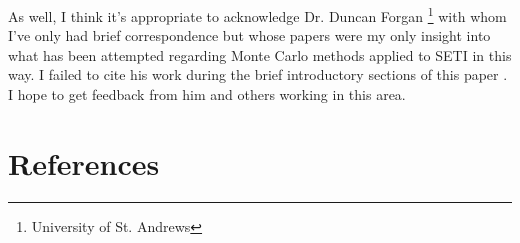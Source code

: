 \documentclass[10pt,a4paper,final]{article}
\numberwithin{equation}{section}
\begin{document}
\begin{multicols}{2}[]
			As well, I think it's appropriate to acknowledge Dr. Duncan Forgan
			\footnote{University of St. Andrews}
			with whom I've only had brief correspondence but whose papers were my
			only insight into what has been attempted regarding Monte Carlo methods
			applied to SETI in this way. I failed to cite his work during the 
			brief introductory sections of this paper \cite{forgan1, forgan2}.
			I hope to get feedback from him and others working in this area.

		\section*{References}
		
		

	\end{multicols}

	
\end{document}

